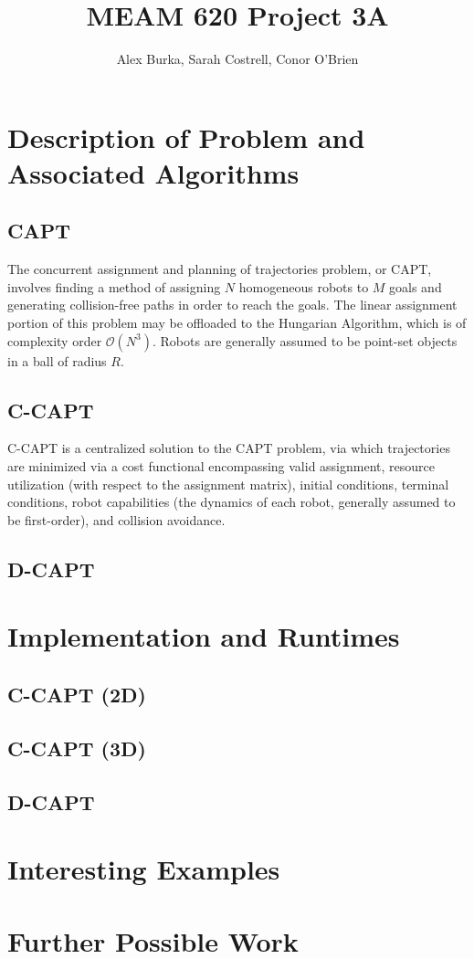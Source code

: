 \documentclass[11pt]{article}
\begin{document}
\author{Alex Burka, Sarah Costrell, Conor O'Brien}
\title{MEAM 620 Project 3A}
\maketitle

\section{Description of Problem and Associated Algorithms}

\subsection{CAPT}
The concurrent assignment and planning of trajectories problem, or CAPT, involves finding a method of assigning $N$ homogeneous robots to $M$ goals and generating collision-free paths in order to reach the goals. The linear assignment portion of this problem may be offloaded to the Hungarian Algorithm, which is of complexity order $\mathcal{O}(N^3)$. Robots are generally assumed to be point-set objects in a ball of radius $R$.

\subsection{C-CAPT}
C-CAPT is a centralized solution to the CAPT problem, via which trajectories are minimized via a cost functional encompassing valid assignment, resource utilization (with respect to the assignment matrix), initial conditions, terminal conditions, robot capabilities (the dynamics of each robot, generally assumed to be first-order), and collision avoidance. \\


\subsection{D-CAPT}


\section{Implementation and Runtimes}
\subsection{C-CAPT (2D)}
\subsection{C-CAPT (3D)}
\subsection{D-CAPT}

\section{Interesting Examples}

\section{Further Possible Work}
\end{document}
